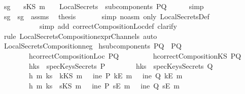 \begin{isabellebody}
\ sg{}{\isacharcolon}\isanewline
\ \ \ {\isachardoublequoteopen}sKS\ m\ {\isasymnotin}\ \ {\isasymUnion}\ {\isacharparenleft}LocalSecrets\ {\isacharbackquote}\ subcomponents\ PQ{\isacharparenright}{\isachardoublequoteclose}\isanewline
\ \ \ \ \isamarkupfalse%
\ simp\isanewline
\ \ \isamarkupfalse%
\ sg{}\ \ sg{}\ \ assms\ \isamarkupfalse%
\ {\isacharquery}thesis\ \isanewline
\ \ \ \ \isamarkupfalse%
\ {\isacharparenleft}simp\ {\isacharparenleft}no{\isacharunderscore}asm{\isacharparenright}\ only{\isacharcolon}\ LocalSecretsDef{\isacharcomma}\ \isanewline
\ \ \ \ \ \ \ \ \ \ \ simp\ add{\isacharcolon}\ correctCompositionLoc{\isacharunderscore}def{\isacharcomma}\ clarify{\isacharparenright}\isanewline
\ \ \ \ \isamarkupfalse%
\ {\isacharparenleft}rule\ LocalSecretsComposition{\isacharunderscore}exprChannel{\isacharunderscore}s{\isacharcomma}\ auto{\isacharparenright}\isanewline
{}\isamarkupfalse%
%
\endisatagproof
{\isafoldproof}%
%
\isadelimproof
\ \ \isanewline
%
\endisadelimproof
\isanewline
{}\isamarkupfalse%
\ LocalSecretsComposition{\isacharunderscore}neg{\isacharcolon}\isanewline
{}\ h{}{\isacharcolon}{\isachardoublequoteopen}subcomponents\ PQ\ {\isacharequal}\ {\isacharbraceleft}P{\isacharcomma}Q{\isacharbraceright}{\isachardoublequoteclose}\ \isanewline
\ \ \ \ \ \ \ \ h{}{\isacharcolon}{\isachardoublequoteopen}correctCompositionLoc\ PQ{\isachardoublequoteclose}\ \isanewline
\ \ \ \ \ \ \ \ h{}{\isacharcolon}{\isachardoublequoteopen}correctCompositionKS\ PQ{\isachardoublequoteclose}\isanewline
\ \ \ \ \ \ \ \ h{}{\isacharcolon}{\isachardoublequoteopen}ks\ {\isasymnotin}\ specKeysSecrets\ P{\isachardoublequoteclose}\isanewline
\ \ \ \ \ \ \ \ h{}{\isacharcolon}{\isachardoublequoteopen}ks\ {\isasymnotin}\ specKeysSecrets\ Q{\isachardoublequoteclose}\isanewline
\ \ \ \ \ \ \ \ h{}{\isacharcolon}{\isachardoublequoteopen}{\isasymforall}\ m{\isachardot}\ ks\ {\isacharequal}\ kKS\ m\ {\isasymlongrightarrow}\ {\isacharparenleft}{\isasymnot}\ ine\ P\ {\isacharparenleft}kE\ m{\isacharparenright}\ {\isasymand}\ {\isasymnot}\ ine\ Q\ {\isacharparenleft}kE\ m{\isacharparenright}{\isacharparenright}{\isachardoublequoteclose}\isanewline
\ \ \ \ \ \ \ \ h{}{\isacharcolon}{\isachardoublequoteopen}{\isasymforall}\ m{\isachardot}\ ks\ {\isacharequal}\ sKS\ m\ {\isasymlongrightarrow}\ {\isacharparenleft}{\isasymnot}\ ine\ P\ {\isacharparenleft}sE\ m{\isacharparenright}\ {\isasymand}\ {\isasymnot}\ ine\ Q\ {\isacharparenleft}sE\ m{\isacharparenright}{\isacharparenright}{\isachardoublequoteclose}\isanewline

\end{isabellebody}
